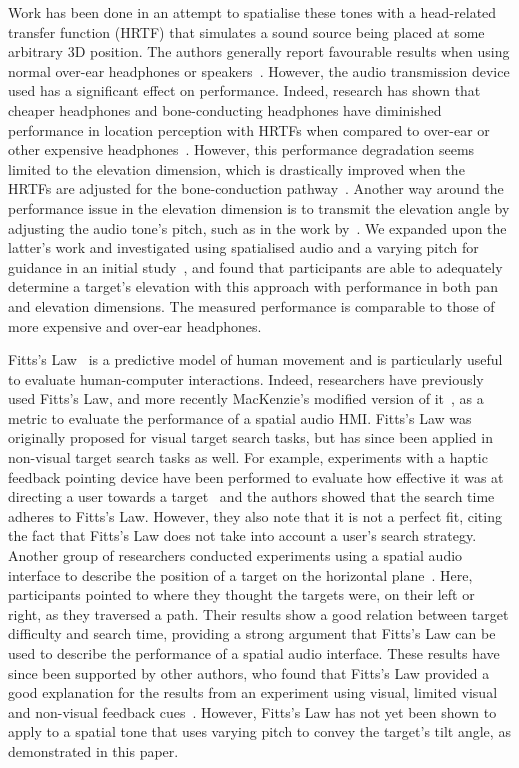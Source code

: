 \documentclass[acmsmall]{acmart}
\begin{document}
Work has been done in an attempt to spatialise these tones with a head-related transfer function (HRTF) that simulates a sound source being placed at some arbitrary 3D position.
The authors generally report favourable results when using normal over-ear headphones or speakers~\citep{geronazzo2016interactive,wilson2007swan,katz2010navig,blum2013spatialized}.
However, the audio transmission device used has a significant effect on performance.
Indeed, research has shown that cheaper headphones and bone-conducting headphones have diminished performance in location perception with HRTFs when compared to over-ear or other expensive headphones~\citep{stanley2006lateralization}.
However, this performance degradation seems limited to the elevation dimension, which is drastically improved when the HRTFs are adjusted for the bone-conduction pathway~\citep{stanley2006lateralization}.
Another way around the performance issue in the elevation dimension is to transmit the elevation angle by adjusting the audio tone's pitch, such as in the work by~\citet{durette2008visuo}.
We expanded upon the latter's work and investigated using spatialised audio and a varying pitch for guidance in an initial study~\cite{lock2019bone}, and found that participants are able to adequately determine a target's elevation with this approach with performance in both pan and elevation dimensions.
The measured performance is comparable to those of more expensive and over-ear headphones.

Fitts's Law~\citep{fitts1954information} is a predictive model of human movement and is particularly useful to evaluate human-computer interactions.
Indeed, researchers have previously used Fitts's Law, and more recently MacKenzie's modified version of it~\citep{mackenzie1992fitts}, as a metric to evaluate the performance of a spatial audio HMI\@.
Fitts's Law was originally proposed for visual target search tasks, but has since been applied in non-visual target search tasks as well.
For example, experiments with a haptic feedback pointing device have been performed to evaluate how effective it was at directing a user towards a target~\citep{ahmaniemi2009augmented} and the authors showed that the search time adheres to Fitts's Law.
However, they also note that it is not a perfect fit, citing the fact that Fitts's Law does not take into account a user's search strategy.
Another group of researchers conducted experiments using a spatial audio interface to describe the position of a target on the horizontal plane~\citep{marentakis2006effects}.
Here, participants pointed to where they thought the targets were, on their left or right, as they traversed a path.
Their results show a good relation between target difficulty and search time, providing a strong argument that Fitts's Law can be used to describe the performance of a spatial audio interface.
These results have since been supported by other authors, who found that Fitts's Law provided a good explanation for the results from an experiment using visual, limited visual and non-visual feedback cues~\citep{wu2010fitts}.
However, Fitts's Law has not yet been shown to apply to a spatial tone that uses varying pitch to convey the target's tilt angle, as demonstrated in this paper.
\end{document}

